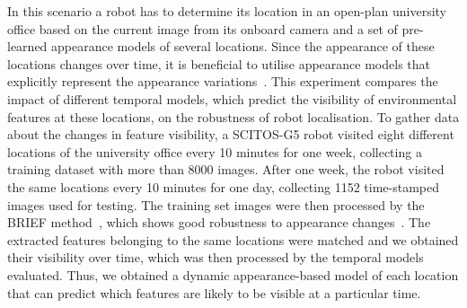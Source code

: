 In this scenario a robot has to determine its location in an open-plan university office based on the current image from its onboard camera and a set of pre-learned appearance models of several locations.
Since the appearance of these locations changes over time, it is beneficial to utilise appearance models that explicitly represent the appearance variations~\cite{neubert2015superpixel,krajnik2017fremen,rosen2016towards,churchill2013experience}.
This experiment compares the impact of different temporal models, which predict the visibility of environmental features at these locations, on the robustness of robot localisation. 
To gather data about the changes in feature visibility, a SCITOS-G5 robot visited eight different locations of the university office every 10 minutes for one week, collecting a training dataset with more than 8000 images.
After one week, the robot visited the same locations every 10 minutes for one day, collecting 1152 time-stamped images used for testing. 
% 
%
The training set images were then processed by the BRIEF method~\cite{calonder2010brief}, which shows good robustness to appearance changes~\cite{krajnik2016griefras}. 
The extracted features belonging to the same locations were matched and we obtained their visibility over time, which was then processed by the temporal models evaluated.
Thus, we obtained a dynamic appearance-based model of each location that can predict which features are likely to be visible at a particular time.

